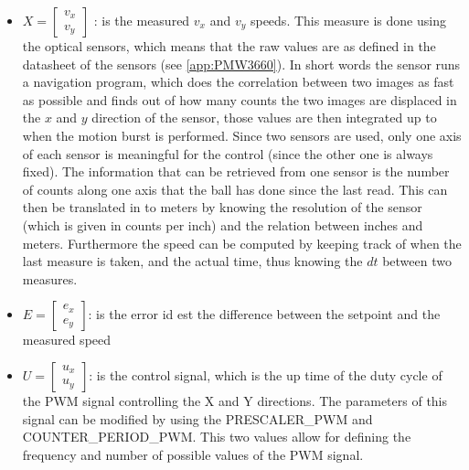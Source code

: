 \documentclass[12pt,a4paper, twoside]{article}
\begin{document}
\begin{itemize}
	\item 
	$X = \begin{bmatrix}
	v_x\\
	v_y
	\end{bmatrix}$
	: is the measured $v_x$ and $v_y$ speeds. This measure is done using the optical sensors, which means that the raw values are as defined in the datasheet of the sensors (see \ref{app:PMW3660}). In short words the sensor runs a navigation program, which does the correlation between two images as fast as possible and finds out of how many counts the two images are displaced in the $x$ and $y$ direction of the sensor, those values are then integrated up to when the motion burst is performed. Since two sensors are used, only one axis of each sensor is meaningful for the control (since the other one is always fixed). The information that can be retrieved from one sensor is the number of counts along one axis that the ball has done since the last read. This can then be translated in to meters by knowing the resolution of the sensor (which is given in counts per inch) and the relation between inches and meters. Furthermore the speed can be computed by keeping track of when the last measure is taken, and the actual time, thus knowing the $dt$ between two measures.
	\item	
	$E = \begin{bmatrix}
	e_x\\
	e_y
	\end{bmatrix}$: is the error id est the difference between the setpoint and the measured speed
	\item  
	$U = 
	\begin{bmatrix}
		u_x\\
		u_y
	\end{bmatrix}$: is the control signal, which is the up time of the duty cycle of the PWM signal controlling the X and Y directions. The parameters of this signal can be modified by using the PRESCALER\_PWM and COUNTER\_PERIOD\_PWM. This two values allow for defining the frequency and number of possible values of the PWM signal.
\end{itemize}
\end{document}
